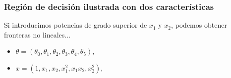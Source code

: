 \documentclass{beamer}
\begin{document}
 \begin{frame}\frametitle{Región de decisión ilustrada con dos características}
 \begin{minipage}[t][5cm][t]{5.5cm}
          \end{minipage}
       \begin{minipage}[t][5cm][t]{4.5cm}
         \footnotesize
     Si introducimos potencias de grado superior de  $x_1$ y $x_2$, podemos obtener fronteras no lineales...
     \begin{itemize}
     \item $\theta=(\theta_0,\theta_1,\theta_2,\theta_3,\theta_4,\theta_5)$,
     \item $x=(1,x_1,x_2,x_1^2,x_1x_2, x_2^2)$,
     \end{itemize}
     
     \end{minipage}\\

 \end{frame}
\end{document}
